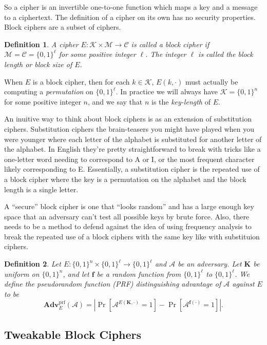 \documentclass[11pt]{article}
\newtheorem{definition}{Definition}
\newcommand{\msgs}{\mathcal{M}}
\newcommand{\ctxts}{\mathcal{C}}
\newcommand{\keys}{\mathcal{K}}
\newcommand{\calA}{\mathcal{A}}
\newcommand{\Adv}{\mathbf{Adv}}
\newcommand{\AdvPRF}[2]{\Adv^{\mathrm{prf}}_{#1}({#2})}
\newcommand{\bits}{\{0,1\}}
\newcommand{\bK}{\mathbf{K}}
\newcommand{\bof}{\mathbf{f}}
\begin{document}
	
	So a cipher is an invertible one-to-one function which maps a key and a message to a ciphertext. The definition of a cipher on its own has no security properties. Block ciphers are a subset of ciphers.
	\begin{definition}
		A cipher $E:\keys\times\msgs\to\ctxts$ is called a \emph{block cipher}
		if $\msgs=\ctxts=\bits^\ell$ for some positive integer $\ell$. The integer
		$\ell$ is called the \emph{block length} or \emph{block size} of $E$.
	\end{definition}
	When $E$ is a block cipher, then for each $k\in\keys$, $E(k,\cdot)$ must
	actually be computing a \emph{permutation} on $\bits^\ell$. In practice we will
	always have $\keys=\bits^n$ for some positive integer $n$, and we say that $n$
	is the \emph{key-length} of $E$.
	
	An inuitive way to think about block ciphers is as an extension of substitution ciphers. Substitution ciphers the brain-teasers you might have played when you were younger where each letter of the alphabet is substituted for another letter of the alphabet. In English they're pretty straightforward to break with tricks like a one-letter word needing to correspond to A or I, or the most frequent character likely corresponding to E. Essentially, a substitution cipher is the repeated use of a block cipher where the key is a permutation on the alphabet and the block length is a single letter.
	
	A ``secure'' block cipher is one that ``looks random'' and has a large enough key space that an adversary can't test all possible keys by brute force. Also, there needs to be a method to defend against the idea of using frequency analysis to break the repeated use of a block ciphers with the same key like with substituion ciphers.
	
	\begin{definition}
		Let $E:\bits^n\times\bits^\ell\to\bits^\ell$ and $\calA$ be an adversary.
		Let $\bK$ be uniform on $\bits^n$, and let $\bof$ be a random function
		from $\bits^\ell$ to $\bits^\ell$.
		We define the \emph{pseudorandom function (PRF) distinguishing advantage
			of $\calA$ against $E$} to be
		\[
		\AdvPRF{E}{\calA} =
		\left|\Pr[\calA^{E(\bK,\cdot)}=1]-\Pr[\calA^{\bof(\cdot)}=1]\right|.
		\]
	\end{definition}
	
	\subsection{Tweakable Block Ciphers}
	
\end{document}
